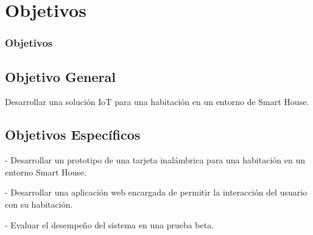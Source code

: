 \section{Objetivos}
\frametitle{Objetivos}

\subsection{Objetivo General}

Desarrollar una solución IoT para una habitación en un entorno de Smart House.

\subsection{Objetivos Específicos}

- Desarrollar un prototipo de una tarjeta inalámbrica para una habitación en un entorno Smart House.

- Desarrollar una aplicación web encargada de permitir la interacción del usuario con su habitación.

- Evaluar el desempeño del sistema en una prueba beta.